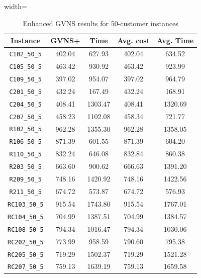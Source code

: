 \documentclass{article}
\begin{document}
\begin{table}[ht]
\centering
\small
\setlength{\tabcolsep}{4pt}
\caption{Enhanced GVNS results for 50-customer instances}
\vspace{4mm}
\begin{adjustbox}{width=\textwidth}
\begin{tabular}{c c c c c}
\toprule
Instance & GVNS+ & Time & Avg. cost & Avg. Time \\
\midrule
\texttt{C102\_50\_5} & 402.04 & 627.93 & 402.04 & 634.52 \\
\texttt{C105\_50\_5} & 463.42 & 930.92 & 463.42 & 923.99 \\
\texttt{C109\_50\_5} & 397.02 & 954.07 & 397.02 & 964.79 \\
\texttt{C201\_50\_5} & 432.24 & 167.49 & 432.24 & 168.91 \\
\texttt{C204\_50\_5} & 408.41 & 1303.47 & 408.41 & 1320.69 \\
\texttt{C207\_50\_5} & 458.23 & 1102.08 & 458.34 & 721.77 \\
\texttt{R102\_50\_5} & 962.28 & 1355.30 & 962.28 & 1358.05 \\
\texttt{R106\_50\_5} & 871.39 & 601.55 & 871.39 & 604.20 \\
\texttt{R110\_50\_5} & 832.24 & 646.08 & 832.84 & 860.38 \\
\texttt{R203\_50\_5} & 663.60 & 900.62 & 666.63 & 1391.20 \\
\texttt{R209\_50\_5} & 748.16 & 1420.92 & 748.16 & 1422.56 \\
\texttt{R211\_50\_5} & 674.72 & 573.87 & 674.72 & 576.93 \\
\texttt{RC103\_50\_5} & 915.54 & 1743.80 & 915.54 & 1767.01 \\
\texttt{RC104\_50\_5} & 704.99 & 1387.51 & 704.99 & 1384.57 \\
\texttt{RC108\_50\_5} & 794.34 & 1016.47 & 794.34 & 1030.06 \\
\texttt{RC202\_50\_5} & 773.99 & 958.59 & 790.60 & 795.38 \\
\texttt{RC205\_50\_5} & 719.29 & 1502.37 & 719.29 & 1521.28 \\
\texttt{RC207\_50\_5} & 759.13 & 1639.19 & 759.13 & 1659.58 \\
\bottomrule
\end{tabular}
\end{adjustbox}
\end{table}
\end{document}
